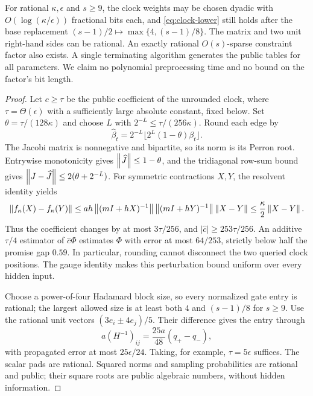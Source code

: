 \begin{proposition}\label{prop:rational-clock}
For rational $\kappa,\epsilon$ and $s\geq9$, the clock weights may be
chosen dyadic with $O(\log(\kappa/\epsilon))$ fractional bits each,
and \eqref{eq:clock-lower} still holds after the base replacement
$(s-1)/2\mapsto\max\{4,(s-1)/8\}$. The matrix and two unit right-hand sides can
be rational. An exactly rational $O(s)$-sparse constraint factor also
exists. A single terminating algorithm generates the public tables for all
parameters. We claim no polynomial preprocessing time and no bound on the
factor's bit length.
\end{proposition}
\begin{proof}
Let $c\geq\tau$ be the public coefficient of the unrounded clock, where
$\tau=\Theta(\epsilon)$ with a sufficiently large absolute constant,
fixed below. Set $\theta=\tau/(128\kappa)$ and choose $L$ with
$2^{-L}\leq\tau/(256\kappa)$. Round each edge by
\[
 \widehat\beta_t=2^{-L}\lfloor2^L(1-\theta)\beta_t\rfloor.
\]
The Jacobi matrix is nonnegative and bipartite, so its norm is its
Perron root. Entrywise monotonicity gives
$\left\lVert\widehat J\right\rVert\leq1-\theta$, and the tridiagonal row-sum bound gives
$\left\lVert J-\widehat J\right\rVert\leq2(\theta+2^{-L})$.
For symmetric contractions $X,Y$, the resolvent identity yields
\begin{equation}\label{eq:resolvent-stability}
 \left\lVert f_\kappa(X)-f_\kappa(Y)\right\rVert
 \leq ah\left\lVert(mI+hX)^{-1}\right\rVert\left\lVert(mI+hY)^{-1}\right\rVert\left\lVert X-Y\right\rVert
 \leq\frac\kappa2\left\lVert X-Y\right\rVert.
\end{equation}
Thus the coefficient changes by at most $3\tau/256$, and
$|\widehat c|\geq253\tau/256$. An additive $\tau/4$ estimator of
$\widehat c\Phi$ estimates $\Phi$ with error at most $64/253$,
strictly below half the promise gap $0.59$. In particular, rounding
cannot disconnect the two queried clock positions. The gauge identity
makes this perturbation bound uniform over every hidden input.

Choose a power-of-four Hadamard block size, so every normalized gate
entry is rational; the largest allowed size is at least both $4$ and
$(s-1)/8$ for $s\geq9$.
Use the rational unit vectors $(3e_i\pm4e_j)/5$.
Their difference gives the entry through
\[
 a(H^{-1})_{ij}=\frac{25a}{48}(q_+-q_-),
\]
with propagated error at most $25\epsilon/24$. Taking, for example,
$\tau=5\epsilon$ suffices. The scalar pads are rational. Squared norms
and sampling probabilities are rational and public; their square roots
are public algebraic numbers, without hidden information.


\end{proof}
